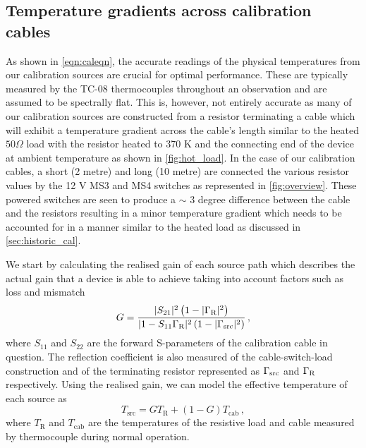 \subsection{Temperature gradients across calibration cables}\label{sec:cable_gradient}
As shown in \cref{eqn:caleqn}, the accurate readings of the physical temperatures from our calibration sources are crucial for optimal performance. These are typically measured by the TC-08 thermocouples throughout an observation and are assumed to be spectrally flat. This is, however, not entirely accurate as many of our calibration sources are constructed from a resistor terminating a cable which will exhibit a temperature gradient across the cable’s length similar to the heated $50 \Omega$ load with the resistor heated to 370 K and the connecting end of the device at ambient temperature as shown in \cref{fig:hot_load}. In the case of our calibration cables, a short (2 metre) and long (10 metre) are connected the various resistor values by the 12 V MS3 and MS4 switches as represented in \cref{fig:overview}. These powered switches are seen to produce a $\sim$ 3 degree difference between the cable and the resistors resulting in a minor temperature gradient which needs to be accounted for in a manner similar to the heated load as discussed in \cref{sec:historic_cal}.

We start by calculating the realised gain of each source path which describes the actual gain that a device is able to achieve taking into account factors such as loss and mismatch
\begin{equation}
    G = \frac{ |S_{21}|^2 \left( 1 - |\Gamma_{\mathrm{\mathrm{R}}}|^2 \right) }{ |1 - S_{11} \Gamma_{\mathrm{\mathrm{R}}}|^2 \left( 1 - |\Gamma_{\mathrm{\mathrm{src}}}|^2 \right) } \,,
    \label{eqn:av_gain}
\end{equation}
where $S_{11}$ and $S_{22}$ are the forward S-parameters of the calibration cable in question. The reflection coefficient is also measured of the cable-switch-load construction and of the terminating resistor represented as $\Gamma_{\mathrm{\mathrm{src}}}$ and $\Gamma_{\mathrm{\mathrm{R}}}$ respectively. Using the realised gain, we can model the effective temperature of each source as
\begin{equation}
    T_{\mathrm{src}} = GT_{\mathrm{R}} + (1 - G)T_{\mathrm{cab}} \,,
    \label{eqn:temp_correction}
\end{equation}
where $T_{\mathrm{R}}$ and $T_{\mathrm{cab}}$ are the temperatures of the resistive load and cable measured by thermocouple during normal operation. 

